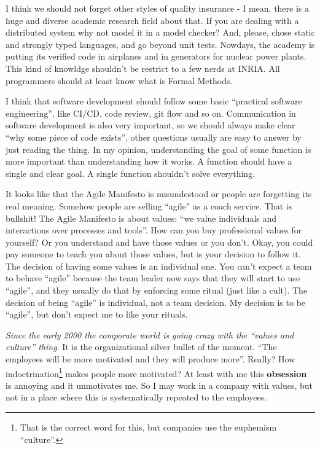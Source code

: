 \documentclass[11pt,a4paper,sans]{moderncv}
\begin{document}
I think we should not forget other styles of quality insurance - I mean, there
is a huge and diverse academic research field about that. If you are dealing
with a distributed system why not model it in a model checker? And, please,
chose static and strongly typed languages, and go beyond unit tests. Nowdays,
the academy is putting its verified code in airplanes and in generators for
nuclear power plants. This kind of knowldge shouldn't be restrict to a few nerds
at INRIA. All programmers should at least know what is Formal Methods.

I think that software development should follow some basic ``practical
software engineering'', like CI/CD, code review, git flow and so on.
Communication in software development is also very important, so we should
always make clear ``why some piece of code exists'', other questions
usually are easy to answer by just reading the thing. In my opinion,
understanding the goal of some function is more important than
understanding how it works. A function should have a single and clear
goal. A single function shouldn't solve everything.

It looks like that the Agile Manifesto is misundestood or people are
forgetting its real meaning. Somehow people are selling ``agile'' as a
coach service. That is bullshit! The Agile Manifesto is about values:
``we value individuals and interactions over processes and tools''.
How can you buy professional values for yourself? Or you understand
and have those values or you don't. Okay, you could pay someone to
teach you about those values, but is your decision to follow it. The
decision of having some values is an individual one. You can't expect
a team to behave ``agile'' because the team leader now says that they
will start to use ``agile'', and they usually do that by enforcing
some ritual (just like a cult).  The decision of being ``agile'' is
individual, not a team decision.  My decision is to be ``agile'', but
don't expect me to like your rituals.

\textit{Since the early 2000 the comporate world is going crazy with the
``values and culture'' thing}. It is the
organizational silver bullet of the moment. ``The employees will be
more motivated and they will produce more''.  Really? How
indoctrination\footnote{That is the correct word for this, but
  companies use the euphemism ``culture''.} makes people more
motivated? At least with me this \textbf{obsession} is annoying and it
unmotivates me.  So I may work in a company with values, but not in a
place where this is systematically repeated to the employees.
\end{document}
